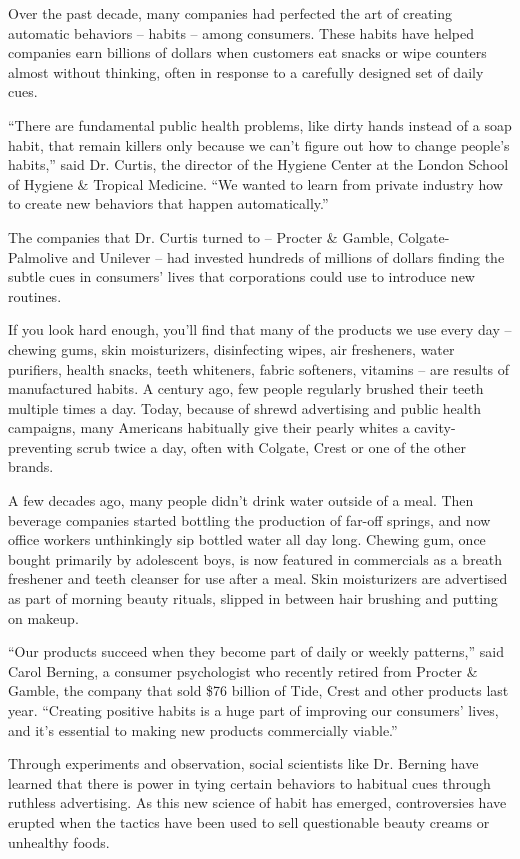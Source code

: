 Over the past decade, many companies had perfected the art of creating automatic behaviors – habits – among consumers. These habits have helped companies earn billions of dollars when customers eat snacks or wipe counters almost without thinking, often in response to a carefully designed set of daily cues.


``There are fundamental public health problems, like dirty hands instead of a soap habit, that remain killers only because we can't figure out how to change people's habits,'' said Dr. Curtis, the director of the Hygiene Center at the London School of Hygiene \& Tropical Medicine. ``We wanted to learn from private industry how to create new behaviors that happen automatically.''


The companies that Dr. Curtis turned to – Procter \& Gamble, Colgate- Palmolive and Unilever – had invested hundreds of millions of dollars finding the subtle cues in consumers' lives that corporations could use to introduce new routines.


If you look hard enough, you'll find that many of the products we use every day – chewing gums, skin moisturizers, disinfecting wipes, air fresheners, water purifiers, health snacks, teeth whiteners, fabric softeners, vitamins – are results of manufactured habits. A century ago, few people regularly brushed their teeth multiple times a day. Today, because of shrewd advertising and public health campaigns, many Americans habitually give their pearly whites a cavity-preventing scrub twice a day, often with Colgate, Crest or one of the other brands.


A few decades ago, many people didn't drink water outside of a meal. Then beverage companies started bottling the production of far-off springs, and now office workers unthinkingly sip bottled water all day long. Chewing gum, once bought primarily by adolescent boys, is now featured in commercials as a breath freshener and teeth cleanser for use after a meal. Skin moisturizers are advertised as part of morning beauty rituals, slipped in between hair brushing and putting on makeup.


``Our products succeed when they become part of daily or weekly patterns,'' said Carol Berning, a consumer psychologist who recently retired from Procter \& Gamble, the company that sold \$76 billion of Tide, Crest and other products last year. ``Creating positive habits is a huge part of improving our consumers' lives, and it's essential to making new products commercially viable.''


Through experiments and observation, social scientists like Dr. Berning have learned that there is power in tying certain behaviors to habitual cues through ruthless advertising. As this new science of habit has emerged, controversies have erupted when the tactics have been used to sell questionable beauty creams or unhealthy foods.